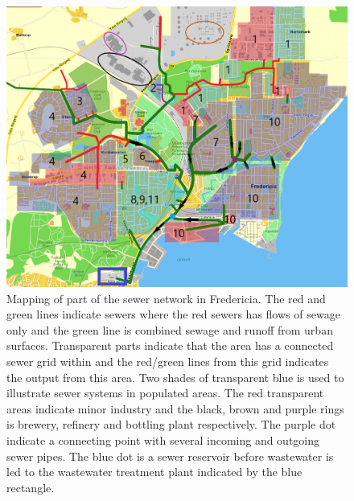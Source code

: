 \begin{figure}[H]
\centering
\includegraphics[width=1\textwidth]{report/system_overview/pictures/kloakgrid_simplified8.png}
\caption{Mapping of part of the sewer network in Fredericia. The red and green lines indicate sewers where the red sewers has flows of sewage only and the green line is combined sewage and runoff from urban surfaces. Transparent parts indicate that the area has a connected sewer grid within and the red/green lines from this grid indicates the output from this area. Two shades of transparent blue is used to illustrate sewer systems in populated areas. The red transparent areas indicate minor industry and the black, brown and purple rings is brewery, refinery and bottling plant respectively. The purple dot indicate a connecting point with several incoming and outgoing sewer pipes. The blue dot is a sewer reservoir  before wastewater is led to the wastewater treatment plant indicated by the blue rectangle.}
\label{fig:kloakgrid_simplified}
\end{figure}



